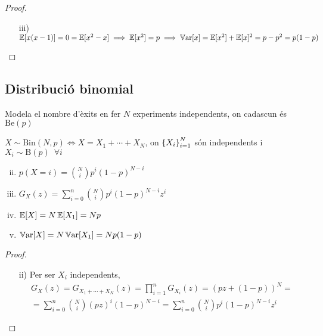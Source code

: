 \begin{proof}
    \begin{enumerate}[i)]
        \item[]
        \item[iii)] $\operatorname{\mathbb{E}}[x(x-1)] = 0 = \operatorname{\mathbb{E}}[x^2-x] \implies \operatorname{\mathbb{E}}[x^2] = p \implies \operatorname{\mathbb{V}ar}[x] = \operatorname{\mathbb{E}}[x^2] + \operatorname{\mathbb{E}}[x]^2
        = p-p^2 = p(1-p)$
    \end{enumerate}
\end{proof}

\subsection*{Distribució binomial}

Modela el nombre d'èxits en fer $N$ experiments independents, on cadascun és $\mathrm{Be}(p)$

\begin{defi}
    $X \sim \mathrm{Bin}(N,p) \iff X = X_1 + \cdots + X_N$,
    on $\left\{ X_i \right\}_{i=1}^{N}$ són independents i $X_i \sim \mathrm{B}(p) \enspace\forall i$
\end{defi}

\begin{prop}
    \begin{enumerate}[i)]
        \item[]
        \item $p(X=i) = \binom{N}{i}p^i(1-p)^{N-i}$
        \item $G_X(z) = \sum_{i=0}^{n} \binom{N}{i}p^i(1-p)^{N-i}z^i$
        \item $\operatorname{\mathbb{E}}[X] = N\operatorname{\mathbb{E}}[X_1] = Np$
        \item $\operatorname{\mathbb{V}ar}[X] = N\operatorname{\mathbb{V}ar}[X_1] = Np(1-p)$
    \end{enumerate}
\end{prop}

\begin{proof}
    \begin{enumerate}[i)]
        \item[]
        \item[ii)] Per ser $X_i$ independents,
        \begin{gather*}
        G_X(z) = G_{X_1 + \cdots + X_N}(z) = \prod_{i=1}^{n}G_{X_i}(z) = (pz+(1-p))^N = \\
        = \sum_{i=0}^n \binom{N}{i}(pz)^i(1-p)^{N-i} = \sum_{i=0}^{n} \binom{N}{i}p^i(1-p)^{N-i}z^i
        \end{gather*}
    \end{enumerate}
\end{proof}

